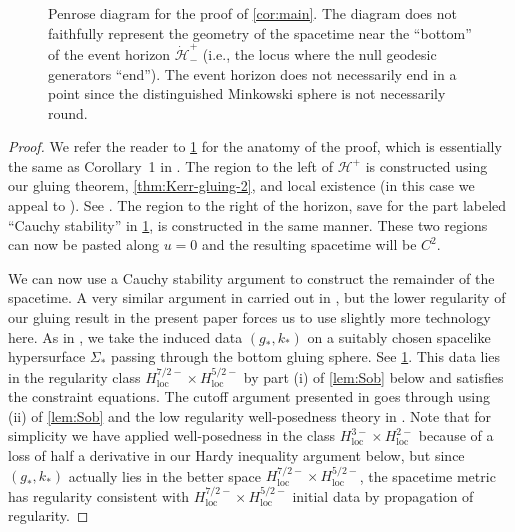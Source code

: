\documentclass[10pt]{article}
\numberwithin{equation}{section}
\theoremstyle{plain}
\theoremstyle{definition}
\begin{document}
\begin{figure}[ht]
\centering{
\def\svgwidth{25pc}
}
\caption{Penrose diagram for the proof of \cref{cor:main}. The diagram does not faithfully represent the geometry of the spacetime near the ``bottom'' of the event horizon $\dot{\mathcal H}^+_-$ (i.e., the locus where the null geodesic generators ``end''). The event horizon does not necessarily end in a point since the distinguished Minkowski sphere is not necessarily round.} 
\label{Penrose-diagram-proof}
\end{figure}

\begin{proof}
We refer the reader to \cref{Penrose-diagram-proof} for the anatomy of the proof, which is essentially the same as Corollary~1 in \cite{KU22}.  The region to the left of $\mathcal H^+$ is constructed using our gluing theorem, \cref{thm:Kerr-gluing-2}, and local existence (in this case we appeal to \cite{Luk-local-existence}). See \cite[Proposition 3.1]{KU22}. The region to the right of the horizon, save for the part labeled ``Cauchy stability'' in \cref{Penrose-diagram-proof}, is constructed in the same manner. These two regions can now be pasted along $u=0$ and the resulting spacetime will be $C^2$. 

We can now use a Cauchy stability argument to construct the remainder of the spacetime. A very similar argument in carried out in \cite[Lemma 5.1]{KU22}, but the lower regularity of our gluing result in the present paper forces us to use slightly more technology here. As in \cite[Lemma 5.1]{KU22}, we take the induced data $(g_*,k_*)$ on a suitably chosen spacelike hypersurface $\Sigma_*$ passing through the bottom gluing sphere. See \cref{Penrose-diagram-proof}. This data lies in the regularity class $H^{7/2-}_\mathrm{loc}\times H^{5/2-}_\mathrm{loc}$ by part (i) of \cref{lem:Sob} below and satisfies the constraint equations. 
The cutoff argument presented in \cite[Lemma 5.1]{KU22} goes through using (ii) of \cref{lem:Sob} and the low regularity well-posedness theory in \cite{HKM}. Note that for simplicity we have applied well-posedness in the class $H^{3-}_\mathrm{loc}\times H^{2-}_\mathrm{loc}$ because of a loss of half a derivative in our Hardy inequality argument below, but since $(g_*,k_*)$ actually lies in the better space $H^{7/2-}_\mathrm{loc}\times H^{5/2-}_\mathrm{loc}$, the spacetime metric has regularity consistent with $H^{7/2-}_\mathrm{loc}\times H^{5/2-}_\mathrm{loc}$ initial data by propagation of regularity. 


\end{proof}
\end{document}
